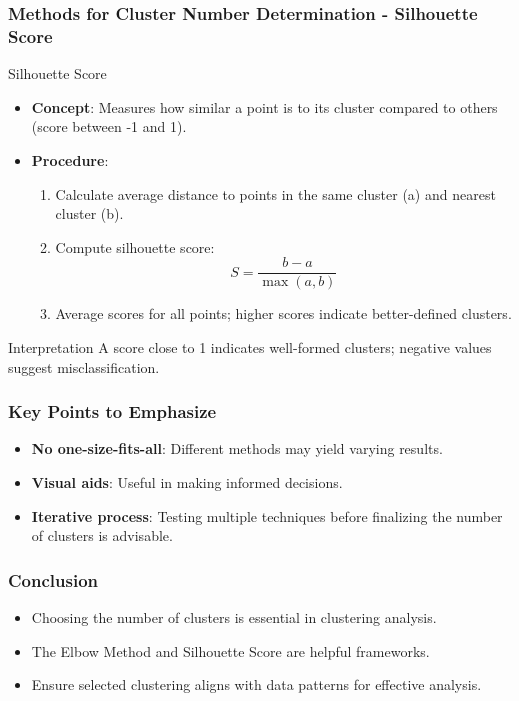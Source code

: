 \documentclass[aspectratio=169]{beamer}
\begin{document}
\begin{frame}[fragile]
    \frametitle{Methods for Cluster Number Determination - Silhouette Score}
    \begin{block}{Silhouette Score}
        \begin{itemize}
            \item \textbf{Concept}: Measures how similar a point is to its cluster compared to others (score between -1 and 1).
            \item \textbf{Procedure}:
            \begin{enumerate}
                \item Calculate average distance to points in the same cluster (a) and nearest cluster (b).
                \item Compute silhouette score: 
                \[
                S = \frac{b - a}{\max(a, b)}
                \]
                \item Average scores for all points; higher scores indicate better-defined clusters.
            \end{enumerate}
        \end{itemize}
    \end{block}
    
    \begin{block}{Interpretation}
        A score close to 1 indicates well-formed clusters; negative values suggest misclassification.
    \end{block}
\end{frame}

\begin{frame}[fragile]
    \frametitle{Key Points to Emphasize}
    \begin{itemize}
        \item \textbf{No one-size-fits-all}: Different methods may yield varying results.
        \item \textbf{Visual aids}: Useful in making informed decisions.
        \item \textbf{Iterative process}: Testing multiple techniques before finalizing the number of clusters is advisable.
    \end{itemize}
\end{frame}

\begin{frame}[fragile]
    \frametitle{Conclusion}
    \begin{itemize}
        \item Choosing the number of clusters is essential in clustering analysis.
        \item The Elbow Method and Silhouette Score are helpful frameworks.
        \item Ensure selected clustering aligns with data patterns for effective analysis.
    \end{itemize}
\end{frame}
\end{document}
